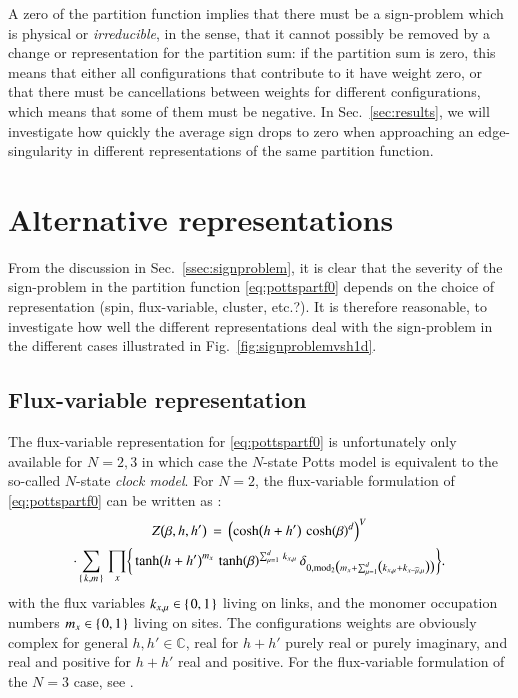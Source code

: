\documentclass[epj]{webofc}
\let\originalleft\left
\let\originalright\right
\renewcommand{\left}{\mathopen{}\mathclose\bgroup\originalleft}
\renewcommand{\right}{\aftergroup\egroup\originalright}
\newcommand{\of}[1]{\left(#1\right)}
\newcommand{\sof}[1]{\bigl(\big.#1\big.\bigr)}
\newcommand{\cof}[1]{\left\{\right.#1\left.\right\}}
\newcommand{\bcof}[1]{\biggl\{\bigg.#1\bigg.\biggr\}}
\newcommand{\umod}{\operatorname{mod}}
\renewcommand*\[{\begin{equation}}
\renewcommand*\]{\end{equation}}
\renewcommand*\hat[1]{\widehat{#1}}
\let\oldemph\emph
\renewcommand*\emph[1]{\oldemph{\textcolor{emphcol}{#1}}}
\begin{document}
A zero of the partition function implies that there must be a sign-problem which is physical or \emph{irreducible}, in the sense, that it cannot possibly be removed by a change or representation for the partition sum: if the partition sum is zero, this means that either all configurations that contribute to it have weight zero, or that there must be cancellations between weights for different configurations, which means that some of them must be negative. In Sec.~\ref{sec:results}, we will investigate how quickly the average sign drops to zero when approaching an edge-singularity in different representations of the same partition function.  


\section{Alternative representations}\label{sec:altrep}
From the discussion in Sec.~\ref{ssec:signproblem}, it is clear that the severity of the sign-problem in the partition function \eqref{eq:pottspartf0} depends on the choice of representation (spin, flux-variable, cluster, etc.?). It is therefore reasonable, to investigate how well the different representations deal with the sign-problem in the different cases illustrated in Fig.~\ref{fig:signproblemvsh1d}.

\subsection{Flux-variable representation}\label{ssec:fluxrep}
The flux-variable representation for \eqref{eq:pottspartf0} is unfortunately only available for $N=2,3$ in which case the $N$-state Potts model is equivalent to the so-called $N$-state \emph{clock model}. For $N=2$, the flux-variable formulation of \eqref{eq:pottspartf0} can be written as \cite{Wolff:2008km}:
\begin{multline}
Z\of{\beta,h,h'}\,=\,\of{\cosh\of{h+h'}\,\cosh\of{\beta}^d}^{V}\\
\cdot\sum\limits_{\cof{k,m}}\,\prod\limits_{x}\bcof{\tanh\of{h+h'}^{m_{x}}\,\tanh\of{\beta}^{\sum_{\mu=1}^{d}\,k_{x,\mu}}\,\delta_{0,\umod_{2}\sof{m_{x}+\sum_{\mu=1}^{d}\sof{k_{x,\mu}+k_{x-\hat{\mu},\mu}}}}} .\label{eq:fluxpartf0}
\end{multline}
with the flux variables $k_{x,\mu}\in\cof{0,1}$ living on links, and the monomer occupation numbers $m_{x}\in\cof{0,1}$ living on sites. The configurations weights are obviously complex for general $h,h'\in\mathbb{C}$, real for $h+h'$ purely real or purely imaginary, and real and positive for $h+h'$ real and positive. For the flux-variable formulation of the $N=3$ case, see \cite{Mercado:2012yf}.
\end{document}
